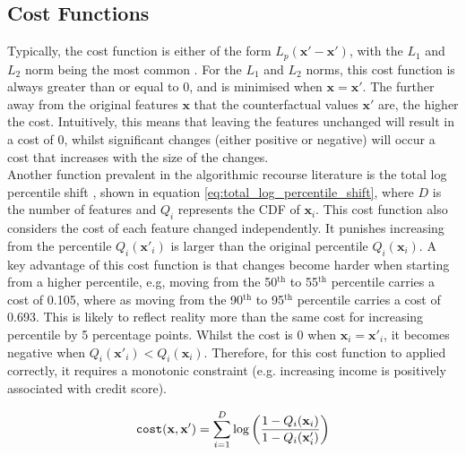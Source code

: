 \subsection{Cost Functions} \label{section:cost_functions_lit_review}

Typically, the cost function is either of the form $L_p(\mathbf{x}'-\mathbf{x}')$, with the $L_1$ and $L_2$ norm being the most common \citep{ramakrishnanSynthesizingActionSequences2020, karimiSurveyAlgorithmicRecourse2022}. For the $L_1$ and $L_2$ norms, this cost function is always greater than or equal to 0, and is minimised when $\mathbf{x} =\mathbf{x}'$. The further away from the original features $\mathbf{x}$ that the counterfactual values $\mathbf{x}'$ are, the higher the cost. Intuitively, this means that leaving the features unchanged will result in a cost of 0, whilst significant changes (either positive or negative) will occur a cost that increases with the size of the changes.\\

Another function prevalent in the algorithmic recourse literature is the total log percentile shift \citep{ustunActionableRecourseLinear2019}, shown in equation \ref{eq:total_log_percentile_shift}, where $D$ is the number of features and $Q_i$ represents the CDF of $\mathbf{x}_i$. This cost function also considers the cost of each feature changed independently. It punishes increasing from the percentile $Q_i(\mathbf{x}'_i)$ is larger than the original percentile $Q_i(\mathbf{x}_i)$. A key advantage of this cost function is that changes become harder when starting from a higher percentile, e.g, moving from the 50$^{\text{th}}$ to 55$^{\text{th}}$ percentile carries a cost of 0.105, where as moving from the 90$^{\text{th}}$ to 95$^{\text{th}}$ percentile carries a cost of 0.693. This is likely to reflect reality more than the same cost for increasing percentile by 5 percentage points. Whilst the cost is 0 when $\mathbf{x}_i = \mathbf{x}'_i$, it becomes negative when $Q_i(\mathbf{x}'_i) < Q_i(\mathbf{x}_i)$. Therefore, for this cost function to applied correctly, it requires a monotonic constraint (e.g. increasing income is positively associated with credit score).

\begin{equation} \label{eq:total_log_percentile_shift}
	\operatorname*{\texttt{cost}}(\mathbf{x}, \mathbf{x}') = \sum_{i=1}^D \log \bigg( \frac{1 - Q_i(\mathbf{x}_i)}{1 - Q_i(\mathbf{x}_i')} \bigg)
\end{equation}

